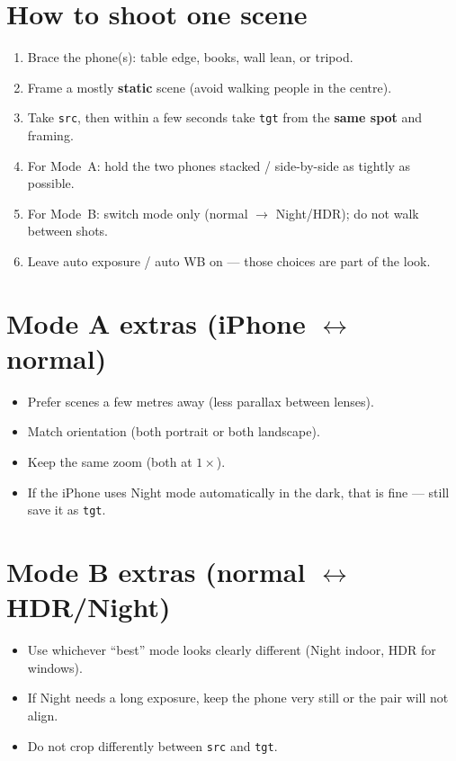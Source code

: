 \documentclass[11pt,a4paper]{article}
\begin{document}
\section{How to shoot one scene}
\begin{enumerate}
  \item Brace the phone(s): table edge, books, wall lean, or tripod.
  \item Frame a mostly \textbf{static} scene (avoid walking people in the centre).
  \item Take \texttt{src}, then within a few seconds take \texttt{tgt} from the \textbf{same spot} and framing.
  \item For Mode~A: hold the two phones stacked / side-by-side as tightly as possible.
  \item For Mode~B: switch mode only (normal $\rightarrow$ Night/HDR); do not walk between shots.
  \item Leave auto exposure / auto WB on --- those choices are part of the look.
\end{enumerate}

\section{Mode A extras (iPhone $\leftrightarrow$ normal)}
\begin{itemize}
  \item Prefer scenes a few metres away (less parallax between lenses).
  \item Match orientation (both portrait or both landscape).
  \item Keep the same zoom (both at $1\times$).
  \item If the iPhone uses Night mode automatically in the dark, that is fine --- still save it as \texttt{tgt}.
\end{itemize}

\section{Mode B extras (normal $\leftrightarrow$ HDR/Night)}
\begin{itemize}
  \item Use whichever ``best'' mode looks clearly different (Night indoor, HDR for windows).
  \item If Night needs a long exposure, keep the phone very still or the pair will not align.
  \item Do not crop differently between \texttt{src} and \texttt{tgt}.
\end{itemize}
\end{document}
